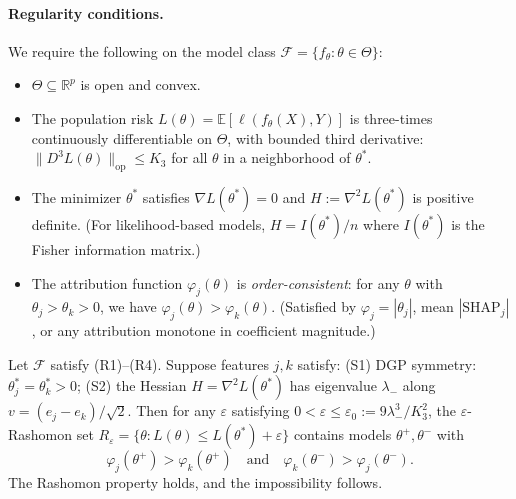 \documentclass{jmlr}
\newcommand{\R}{\mathbb{R}}
\newcommand{\E}{\mathbb{E}}
\begin{document}
\paragraph{Regularity conditions.}
We require the following on the model class $\mathcal{F} = \{f_\theta : \theta \in \Theta\}$:
\begin{itemize}
    \item[\textbf{(R1)}] $\Theta \subseteq \R^p$ is open and convex.
    \item[\textbf{(R2)}] The population risk $L(\theta) = \E[\ell(f_\theta(X), Y)]$ is three-times continuously differentiable on $\Theta$, with bounded third derivative: $\|D^3 L(\theta)\|_{\text{op}} \leq K_3$ for all $\theta$ in a neighborhood of $\theta^*$.
    \item[\textbf{(R3)}] The minimizer $\theta^*$ satisfies $\nabla L(\theta^*) = 0$ and $H := \nabla^2 L(\theta^*)$ is positive definite. (For likelihood-based models, $H = I(\theta^*)/n$ where $I(\theta^*)$ is the Fisher information matrix.)
    \item[\textbf{(R4)}] The attribution function $\varphi_j(\theta)$ is \emph{order-consistent}: for any $\theta$ with $\theta_j > \theta_k > 0$, we have $\varphi_j(\theta) > \varphi_k(\theta)$. (Satisfied by $\varphi_j = |\theta_j|$, mean $|\text{SHAP}_j|$, or any attribution monotone in coefficient magnitude.)
\end{itemize}

\begin{theorem}
\label{thm:fim-impossibility}
Let $\mathcal{F}$ satisfy (R1)--(R4). Suppose features $j, k$ satisfy: (S1) DGP symmetry: $\theta^*_j = \theta^*_k > 0$; (S2) the Hessian $H = \nabla^2 L(\theta^*)$ has eigenvalue $\lambda_-$ along $v = (e_j - e_k)/\sqrt{2}$. Then for any $\varepsilon$ satisfying $0 < \varepsilon \leq \varepsilon_0 := 9\lambda_-^3/K_3^2$, the $\varepsilon$-Rashomon set $R_\varepsilon = \{\theta : L(\theta) \leq L(\theta^*) + \varepsilon\}$ contains models $\theta^+, \theta^-$ with
\[
    \varphi_j(\theta^+) > \varphi_k(\theta^+) \quad\text{and}\quad \varphi_k(\theta^-) > \varphi_j(\theta^-).
\]
The Rashomon property holds, and the impossibility follows.
\end{theorem}
\end{document}
